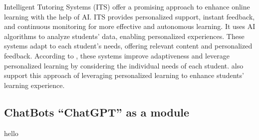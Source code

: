 Intelligent Tutoring Systems (ITS) offer a promising approach to enhance online learning with the help of AI. 
ITS provides personalized support, instant feedback, and continuous monitoring for more effective and autonomous learning. 
It uses AI algorithms to analyze students' data, enabling personalized experiences. These systems adapt to each student's needs, 
offering relevant content and personalized feedback. According to \citep{l_d_of_cs_akshara_first_grade_college_2023}, these systems improve adaptiveness and leverage 
personalized learning by considering the individual needs of each student. \citep{bradac_design_2022} also support this approach 
of leveraging personalized learning to enhance students' learning experience.


\subsection{ChatBots ``ChatGPT'' as a module}
hello
